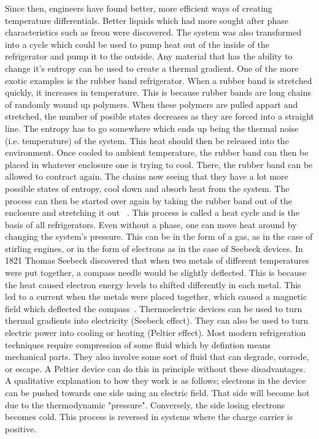 	Since then, engineers have found better, more efficient ways of creating temperature differentials. Better liquids which had more sought after phase characteristics such as freon were discovered. The system was also transformed into a cycle which could be used to pump heat out of the inside of the refrigerator and pump it to the outside. Any material that has the ability to change it's entropy can be used to create a thermal gradient. One of the more exotic examples is the rubber band refrigerator. When a rubber band is stretched quickly, it increases in temperature. This is because rubber bands are long chains of randomly wound up polymers. When these polymers are pulled appart and stretched, the number of posible states decreases as they are forced into a straight line. The entropy has to go somewhere which ends up being the thermal noise (i.e. temperature) of the system. This heat should then be released into the environment. Once cooled to ambient temperature, the rubber band can then be placed in whatever enclosure one is trying to cool. There, the rubber band can be allowed to contract again. The chains now seeing that they have a lot more possible states of entropy, cool down and absorb heat from the system. The process can then be started over again by taking the rubber band out of the enclosure and stretching it out ~\cite{Brown63}. This process is called a heat cycle and is the basis of all refrigerators. Even without a phase, one can move heat around by changing the system's pressure. This can be in the form of a gas, as in the case of stirling engines, or in the form of electrons as in the case of Seebeck devices. 
	In 1821 Thomas Seebeck discovered that when two metals of different temperatures were put together, a compass needle would be slightly deflected. This is because the heat caused electron energy levels to shifted differently in each metal. This led to a current when the metals were placed together, which caused a magnetic field which deflected the compass~\cite{Dommelen13}. Thermoelectric devices can be used to turn thermal gradients into electricity (Seebeck effect). They can also be used to turn electric power into cooling or heating (Peltier effect). Most modern refrigeration techniques require compression of some fluid which by defintion means mechanical parts. They also involve some sort of fluid that can degrade, corrode, or escape. A Peltier device can do this in principle without these disadvantages. A qualitative explanation to how they work is as follows; electrons in the device can be pushed towards one side using an electric field. That side will become hot due to the thermodynamic "pressure". Conversely, the side losing electrons becomes cold. This process is reversed in systems where the charge carrier is positive.

